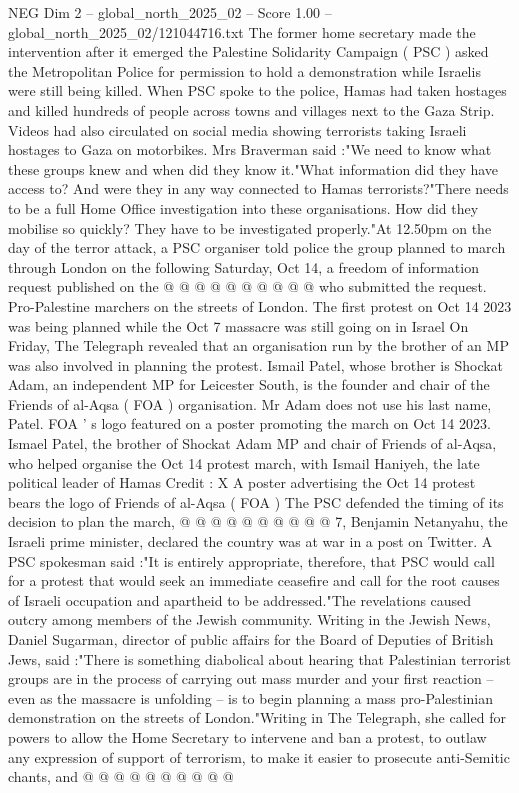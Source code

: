 \begin{textsample}{NEG Dim 2 – global\_north\_2025\_02 – Score 1.00 – global\_north\_2025\_02/121044716.txt}  \label{ex:f2_neg_012}
The former home secretary made the intervention after it emerged the Palestine Solidarity Campaign ( PSC ) asked the Metropolitan Police for permission to hold a demonstration while Israelis were still being killed.
When PSC spoke to the police, Hamas had taken hostages and killed hundreds of people across towns and villages next to the Gaza Strip.
Videos had also circulated on social media showing terrorists taking Israeli hostages to Gaza on motorbikes.
Mrs Braverman said :"We need to know what these groups knew and when did they know it."What information did they have access to?
And were they in any way connected to Hamas terrorists?"There needs to be a full Home Office investigation into these organisations.
How did they mobilise so quickly?
They have to be investigated properly."At 12.50pm on the day of the terror attack, a PSC organiser told police the group planned to march through London on the following Saturday, Oct 14, a freedom of information request published on the @ @ @ @ @ @ @ @ @ @ who submitted the request.
Pro-Palestine marchers on the streets of London.
The first protest on Oct 14 2023 was being planned while the Oct 7 massacre was still going on in Israel On Friday, The Telegraph revealed that an organisation run by the brother of an MP was also involved in planning the protest.
Ismail Patel, whose brother is Shockat Adam, an independent MP for Leicester South, is the founder and chair of the Friends of al-Aqsa ( FOA ) organisation.
Mr Adam does not use his last name, Patel.
FOA ' s logo featured on a poster promoting the march on Oct 14 2023.
Ismael Patel, the brother of Shockat Adam MP and chair of Friends of al-Aqsa, who helped organise the Oct 14 protest march, with Ismail Haniyeh, the late political leader of Hamas Credit : X A poster advertising the Oct 14 protest bears the logo of Friends of al-Aqsa ( FOA ) The PSC defended the timing of its decision to plan the march, @ @ @ @ @ @ @ @ @ @ 7, Benjamin Netanyahu, the Israeli prime minister, declared the country was at war in a post on Twitter.
A PSC spokesman said :"It is entirely appropriate, therefore, that PSC would call for a protest that would seek an immediate ceasefire and call for the root causes of Israeli occupation and apartheid to be addressed."The revelations caused outcry among members of the Jewish community.
Writing in the Jewish News, Daniel Sugarman, director of public affairs for the Board of Deputies of British Jews, said :"There is something diabolical about hearing that Palestinian terrorist groups are in the process of carrying out mass murder and your first reaction -- even as the massacre is unfolding -- is to begin planning a mass pro-Palestinian demonstration on the streets of London."Writing in The Telegraph, she called for powers to allow the Home Secretary to intervene and ban a protest, to outlaw any expression of support of terrorism, to make it easier to prosecute anti-Semitic chants, and @ @ @ @ @ @ @ @ @ @

\end{textsample}
